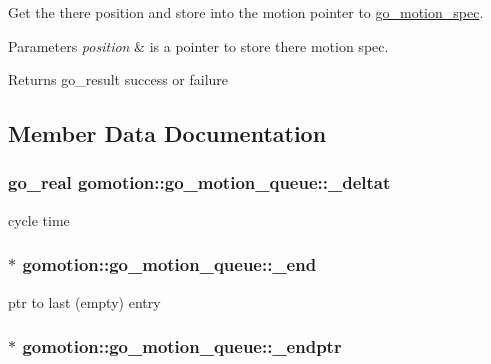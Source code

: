 Get the there position and store into the motion pointer to \hyperlink{structgomotion_1_1go__motion__spec}{go\-\_\-motion\-\_\-spec}. 


\begin{DoxyParams}{Parameters}
{\em position} & is a pointer to store there motion spec. \\
\hline
\end{DoxyParams}
\begin{DoxyReturn}{Returns}
go\-\_\-result success or failure 
\end{DoxyReturn}


\subsection{Member Data Documentation}
\hypertarget{structgomotion_1_1go__motion__queue_a21be21caeb469dc31cae7e4d193f6f63}{
\subsubsection[{\-\_\-deltat}]{\setlength{\rightskip}{0pt plus 5cm}go\-\_\-real gomotion\-::go\-\_\-motion\-\_\-queue\-::\-\_\-deltat\hspace{0.3cm}{\ttfamily [protected]}}}\label{structgomotion_1_1go__motion__queue_a21be21caeb469dc31cae7e4d193f6f63}
cycle time \hypertarget{structgomotion_1_1go__motion__queue_a843d9fbbb3d45019e412efe56e3356a9}{
\subsubsection[{\-\_\-end}]{$\ast$ gomotion\-::go\-\_\-motion\-\_\-queue\-::\-\_\-end\hspace{0.3cm}{\ttfamily [protected]}}}\label{structgomotion_1_1go__motion__queue_a843d9fbbb3d45019e412efe56e3356a9}
ptr to last (empty) entry \hypertarget{structgomotion_1_1go__motion__queue_a56b0eb35d9ff084d1a1f555dae780ad9}{
\subsubsection[{\-\_\-endptr}]{$\ast$ gomotion\-::go\-\_\-motion\-\_\-queue\-::\-\_\-endptr\hspace{0.3cm}{\ttfamily [protected]}}}\label{structgomotion_1_1go__motion__queue_a56b0eb35d9ff084d1a1f555dae780ad9}
